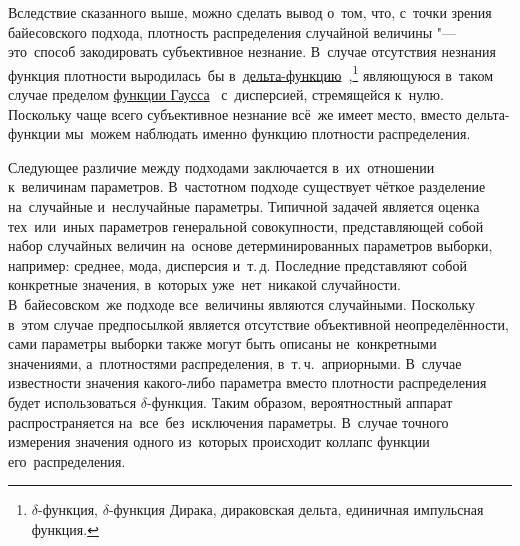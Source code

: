 \documentclass[]{scrartcl}
\begin{document}
Вследствие сказанного выше, можно сделать вывод о~том, что, с~точки зрения байесовского подхода, плотность распределения случайной величины "--- это~способ закодировать субъективное незнание. В~случае отсутствия незнания функция плотности выродилась~бы в~\href{https://ru.wikipedia.org/wiki/Дельта-функцию}{дельта-функцию}~\cite{Wiki:delta-function},\footnote{$\delta$-функция, $\delta$-функция Дирака, дираковская дельта, единичная импульсная функция.} являющуюся в~таком случае пределом \href{https://ru.wikipedia.org/wiki/Гауссова_функция}{функции Гаусса}~\cite{Wiki:Gauss-function} с~дисперсией, стремящейся к~нулю. Поскольку чаще всего субъективное незнание  всё~же имеет место, вместо дельта-функции  мы~можем наблюдать именно функцию плотности распределения.

Следующее различие между подходами заключается в~их~отношении к~величинам параметров. В~частотном подходе существует чёткое разделение на~случайные и~неслучайные параметры. Типичной задачей является оценка тех~или~иных параметров генеральной совокупности, представляющей собой набор случайных величин на~основе детерминированных параметров выборки, например: среднее, мода, дисперсия и~т.\,д. Последние представляют собой конкретные значения, в~которых уже~нет~никакой случайности. В~байесовском~же подходе все~величины являются случайными. Поскольку в~этом случае предпосылкой является отсутствие объективной неопределённости, сами параметры выборки также могут быть описаны не~конкретными значениями, а~плотностями распределения, в~т.\,ч.~априорными. В~случае известности значения какого-либо параметра вместо плотности распределения будет использоваться $\delta$-функция. Таким образом, вероятностный аппарат распространяется на~все~без~исключения параметры. В~случае точного измерения значения одного из~которых происходит коллапс функции его~распределения.
\end{document}
